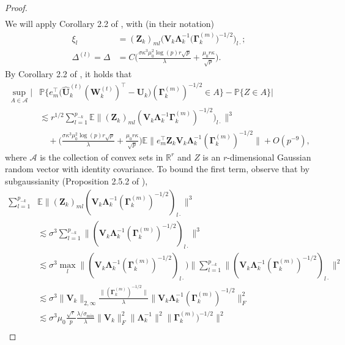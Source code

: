 \documentclass[10pt]{article}
\newcommand{\0}{{\mathbf{0}}}
\newcommand{\1}{{\mathbf{1}}}
\newcommand{\E}{{\mathbf{E}}}
\newcommand{\U}{{\mathbf{U}}}
\renewcommand{\citet}{\cite}
\renewcommand{\t}{^{\top}}
\newcommand{\uhat}{\mathbf{\hat{U}}}
\newcommand{\p}{\mathbb{P}}
\newcommand{\inv}{^{-1}}
\renewcommand{\E}{\mathbb{E}}
\renewcommand{\hat}{\widehat}
\renewcommand{\hat}{\widehat}
\begin{document}
\begin{proof}
\begin{align*}
\end{align*}
We will apply Corollary 2.2 of \citet{shao_berryesseen_2022}, with (in their notation)
\begin{align*}
    \xi_l &= (\mathbf{Z}_k)_{ml} \bigg( \mathbf{V}_k \mathbf{\Lambda}_k\inv \big( \mathbf{\Gamma}^{(m)}_k \big)^{-1/2} \bigg)_{l\cdot}; \\
    \Delta^{(l)} = \Delta &= C \bigg(\frac{\sigma \kappa^3 \mu_0^2 \log(p) r\sqrt{p}}{\lambda} + \frac{\mu_0 r \kappa}{\sqrt{p}}\bigg).
\end{align*}
By Corollary 2.2 of \citet{shao_berryesseen_2022}, it holds that
\begin{align*}
    \sup_{A \in \mathcal{A}} | &\p\bigg\{ e_m\t \bigg( \uhat_k^{(t)} (\mathbf{W}_k^{(t)})\t - \U_k \bigg) (\mathbf{\Gamma}^{(m)}_k)^{-1/2} \in A \bigg\} - \p \{ Z \in A \} | \\
    &\lesssim r^{1/2} \sum_{l=1}^{p_{-k}} \E \| (\mathbf{Z}_k)_{ml} (\mathbf{V}_k \mathbf{\Lambda}_k\inv \mathbf{\Gamma}^{(m)}_k)^{-1/2}  )_{l\cdot}\|^3 \\
    &\quad + \bigg( \frac{\sigma\kappa^3 \mu_0^2 \log(p) r \sqrt{p}}{\lambda} + \frac{\mu_0 r \kappa}{\sqrt{p}} \bigg) \E \| e_m\t \mathbf{Z}_k \mathbf{V}_k \mathbf{\Lambda}_k\inv(\mathbf{\Gamma}^{(m)}_k)^{-1/2} \| + O(p^{-9}),
\end{align*}
where $\mathcal{A}$ is the collection of convex sets in $\mathbb{R}^r$ and $Z$ is an $r$-dimensional Gaussian random vector with identity covariance. To bound the first term, observe that by subgaussianity (Proposition 2.5.2 of  \citet{vershynin_high-dimensional_2018}),
\begin{align*}
    \sum_{l=1}^{p_{-k}} &\E \| (\mathbf{Z}_k)_{ml} (\mathbf{V}_k \mathbf{\Lambda}_k\inv (\mathbf{\Gamma}^{(m)}_k)^{-1/2} )_{l\cdot}\|^3 \\
    &\lesssim \sigma^3 \sum_{l=1}^{p_{-k}} \| (\mathbf{V}_k \mathbf{\Lambda}_k\inv (\mathbf{\Gamma}^{(m)}_k)^{-1/2} )_{l\cdot}\|^3  \\
    &\lesssim \sigma^3 \max_{l} \| (\mathbf{V}_k \mathbf{\Lambda}_k\inv (\mathbf{\Gamma}^{(m)}_k)^{-1/2} )_{l\cdot}) \| \sum_{l=1}^{p_{-k}}  \| (\mathbf{V}_k \mathbf{\Lambda}_k\inv (\mathbf{\Gamma}^{(m)}_k)^{-1/2} )_{l\cdot}\|^2 \\
    &\lesssim \sigma^3 \| \mathbf{V}_k \|_{2,\infty} \frac{\| (\mathbf{\Gamma}^{(m)}_k)^{-1/2} \|}{\lambda} \| \mathbf{V}_k \mathbf{\Lambda}_k\inv (\mathbf{\Gamma}^{(m)}_k)^{-1/2} \|^2_F \\
    &\lesssim \sigma^3 \mu_0 \frac{\sqrt{r}}{p} \frac{\lambda/\sigma_{\min}}{\lambda} \| \mathbf{V}_k \|_F^2 \| \mathbf{\Lambda}_k\inv \|^2 \| \mathbf{\Gamma}^{(m)}_k)^{-1/2} \|^2 \\

\end{align*}
\end{proof}
\end{document}
